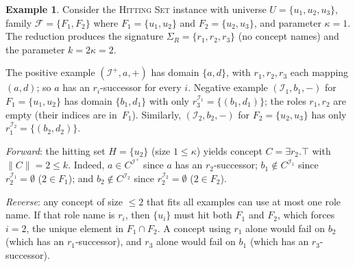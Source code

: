 \documentclass[accepted]{uai2026} %
\theoremstyle{definition}
\newtheorem{example}[theorem]{Example}
\theoremstyle{remark}
\begin{document}
\begin{example}\label{ex:reduction}
  Consider the \textsc{Hitting Set} instance with
  universe $U = \{u_1, u_2, u_3\}$, family
  $\mathcal{F} = \{F_1, F_2\}$ where $F_1 = \{u_1, u_2\}$ and
  $F_2 = \{u_2, u_3\}$, and parameter $\kappa = 1$.
  The reduction produces the signature
  $\Sigma_R = \{r_1, r_2, r_3\}$ (no concept names) and the
  parameter $k = 2\kappa = 2$.

  The positive example $(\mathcal{I}^+, a, +)$ has
  domain $\{a, d\}$, with $r_1, r_2, r_3$ each mapping $(a, d)$;
  so $a$ has an $r_i$-successor for every $i$.
  Negative example $(\mathcal{I}_1, b_1, -)$ for
  $F_1 = \{u_1, u_2\}$ has domain $\{b_1, d_1\}$ with only
  $r_3^{\mathcal{I}_1} = \{(b_1, d_1)\}$; the roles $r_1, r_2$
  are empty (their indices are in~$F_1$).
  Similarly, $(\mathcal{I}_2, b_2, -)$ for $F_2 = \{u_2, u_3\}$
  has only $r_1^{\mathcal{I}_2} = \{(b_2, d_2)\}$.

  \emph{Forward}: the hitting set
  $H = \{u_2\}$ (size $1 \leq \kappa$) yields concept
  $C = \exists r_2.\top$ with $\|C\| = 2 \leq k$. Indeed,
  $a \in C^{\mathcal{I}^+}$ since $a$ has an $r_2$-successor;
  $b_1 \notin C^{\mathcal{I}_1}$ since $r_2^{\mathcal{I}_1}
  = \emptyset$ ($2 \in F_1$); and
  $b_2 \notin C^{\mathcal{I}_2}$ since
  $r_2^{\mathcal{I}_2} = \emptyset$ ($2 \in F_2$).

  \emph{Reverse}: any concept of size $\leq 2$
  that fits all examples can use at most one role name. If that
  role name is $r_i$, then $\{u_i\}$ must hit both $F_1$ and
  $F_2$, which forces $i = 2$, the unique element in
  $F_1 \cap F_2$. A concept using $r_1$ alone would fail on
  $b_2$ (which has an $r_1$-successor), and $r_3$ alone would fail
  on $b_1$ (which has an $r_3$-successor).
\end{example}
\end{document}
